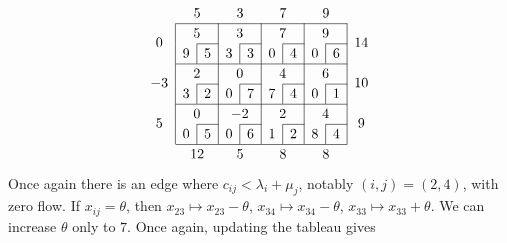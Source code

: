 \[
	\arraycolsep=5pt\def\arraystretch{1.2}
	\begin{array}{c|c|c|c|c|c|c|c|c|c}
		\multicolumn{1}{c}{}    & \multicolumn{2}{c}{5}  & \multicolumn{2}{c}{3}   & \multicolumn{2}{c}{7}  & \multicolumn{2}{c}{9}  & \multicolumn{1}{c}{}                                       \\\cline{2-9}
		\multirow{2}{*}{\(0\)}  & \multicolumn{2}{c|}{5} & \multicolumn{2}{c|}{3}  & \multicolumn{2}{c|}{7} & \multicolumn{2}{c|}{9} & \multirow{2}{*}{\(14\)}                                    \\\cline{3-3}\cline{5-5}\cline{7-7}\cline{9-9}
		                        & \multicolumn{1}{c|}{9} & 5                       & \multicolumn{1}{c|}{3} & 3                      & \multicolumn{1}{c|}{0}  & 4 & \multicolumn{1}{c|}{0} & 6 & \\\cline{2-9}
		\multirow{2}{*}{\(-3\)} & \multicolumn{2}{c|}{2} & \multicolumn{2}{c|}{0}  & \multicolumn{2}{c|}{4} & \multicolumn{2}{c|}{6} & \multirow{2}{*}{\(10\)}                                    \\\cline{3-3}\cline{5-5}\cline{7-7}\cline{9-9}
		                        & \multicolumn{1}{c|}{3} & 2                       & \multicolumn{1}{c|}{0} & 7                      & \multicolumn{1}{c|}{7}  & 4 & \multicolumn{1}{c|}{0} & 1 & \\\cline{2-9}
		\multirow{2}{*}{\(5\)}  & \multicolumn{2}{c|}{0} & \multicolumn{2}{c|}{-2} & \multicolumn{2}{c|}{2} & \multicolumn{2}{c|}{4} & \multirow{2}{*}{\(9\)}                                     \\\cline{3-3}\cline{5-5}\cline{7-7}\cline{9-9}
		                        & \multicolumn{1}{c|}{0} & 5                       & \multicolumn{1}{c|}{0} & 6                      & \multicolumn{1}{c|}{1}  & 2 & \multicolumn{1}{c|}{8} & 4 & \\\cline{2-9}
		\multicolumn{1}{c}{}    & \multicolumn{2}{c}{12} & \multicolumn{2}{c}{5}   & \multicolumn{2}{c}{8}  & \multicolumn{2}{c}{8}  & \multicolumn{1}{c}{}
	\end{array}
\]
Once again there is an edge where \( c_{ij} < \lambda_i + \mu_j \), notably \((i,j) = (2,4)\), with zero flow.
If \( x_{ij} = \theta \), then \( x_{23} \mapsto x_{23} - \theta \), \( x_{34} \mapsto x_{34} - \theta \), \( x_{33} \mapsto x_{33} + \theta \).
We can increase \( \theta \) only to \( 7 \).
Once again, updating the tableau gives

